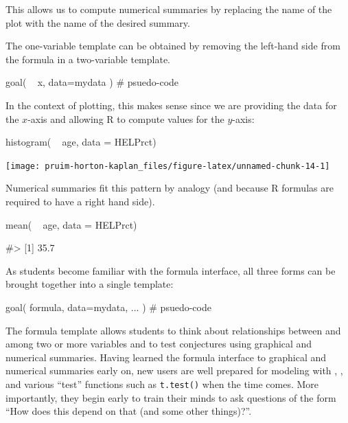 \noindent
This allows us to compute numerical summaries by replacing the name of
the plot with the name of the desired summary.

The one-variable template can be obtained by removing the left-hand side
from the formula in a two-variable template.

\begin{Schunk}
\begin{Sinput}
goal( ~ x, data=mydata )               # psuedo-code
\end{Sinput}
\end{Schunk}

\noindent
In the context of plotting, this makes sense since we are providing the
data for the \(x\)-axis and allowing R to compute values for the
\(y\)-axis:

\begin{Schunk}
\begin{Sinput}
histogram( ~ age, data = HELPrct)
\end{Sinput}


\begin{center}\texttt{[image: pruim-horton-kaplan\_files/figure-latex/unnamed-chunk-14-1]} \end{center}

\end{Schunk}

\noindent
Numerical summaries fit this pattern by analogy (and because R formulas
are required to have a right hand side).

\begin{Schunk}
\begin{Sinput}
mean( ~ age, data = HELPrct)
\end{Sinput}
\begin{Soutput}
#> [1] 35.7
\end{Soutput}
\end{Schunk}

As students become familiar with the formula interface, all three forms
can be brought together into a single template:

\begin{Schunk}
\begin{Sinput}
goal( formula, data=mydata, ... )      # psuedo-code
\end{Sinput}
\end{Schunk}

\noindent
The formula template allows students to think about relationships
between and among two or more variables and to test conjectures using
graphical and numerical summaries. Having learned the formula interface
to graphical and numerical summaries early on, new users are well
prepared for modeling with , , and various
``test'' functions such as \texttt{t.test()} when the time comes. More
importantly, they begin early to train their minds to ask questions of
the form ``How does this depend on that (and some other things)?''.

